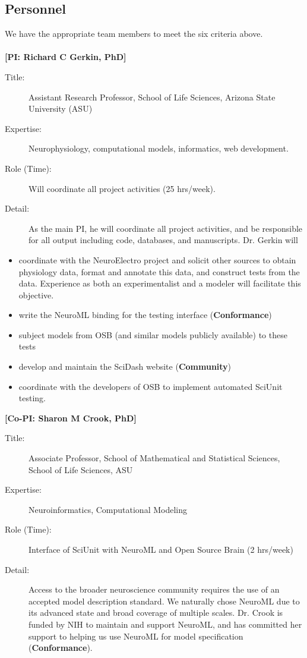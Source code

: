 \documentclass[a4paper,12pt]{article}
\begin{document}
\subsection{Personnel}
We have the appropriate team members to meet the six criteria above. 
\\
\\
\textbf{[PI: Richard C Gerkin, PhD]}
\begin{description}
\item[Title:] Assistant Research Professor, School of Life Sciences, Arizona State University (ASU)
\item[Expertise:] Neurophysiology, computational models, informatics, web development.   
\item[Role (Time):] Will coordinate all project activities (25 hrs/week).  
\item[Detail:] As the main PI, he will coordinate all project activities, and be responsible for all output including code, databases, and manuscripts. Dr. Gerkin will
\end{description}
\begin{itemize}
\item coordinate with the NeuroElectro project and solicit other sources to obtain physiology data, format and annotate this data, and construct tests from the data.  Experience as both an experimentalist and a modeler will facilitate this objective.   
\item write the NeuroML binding for the testing interface (\textbf{Conformance})
\item subject models from OSB (and similar models publicly available) to these tests 
\item develop and maintain the SciDash website (\textbf{Community})
\item coordinate with the developers of OSB to implement automated SciUnit testing.
\end{itemize}
\textbf{[Co-PI: Sharon M Crook, PhD]}
\begin{description}
\item[Title:] Associate Professor, School of Mathematical and Statistical Sciences, School of Life Sciences, ASU
\item[Expertise:] Neuroinformatics, Computational Modeling
\item[Role (Time):] Interface of SciUnit with NeuroML and Open Source Brain (2 hrs/week)
\item[Detail:] Access to the broader neuroscience community requires the use of an accepted model description standard.  We naturally chose NeuroML due to its advanced state and broad coverage of multiple scales.  Dr. Crook is funded by NIH to maintain and support NeuroML, and has committed her support to helping us use NeuroML for model specification (\textbf{Conformance}).  
\end{description}
\end{document}
